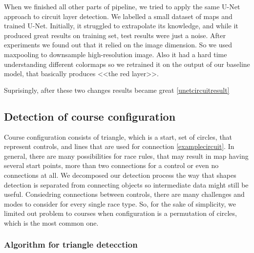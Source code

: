 \documentclass[a4paper,12pt]{extarticle}
\begin{document}
When we finished all other parts of pipeline, we tried to apply the same U-Net approach to circuit layer detection.
We labelled a small dataset of maps and trained U-Net.
Initially, it struggled to extrapolate its knowledge, and while it produced great results on training set, test results were just a noise.
After experiments we found out that it relied on the image dimension. So we used maxpooling to downsample high-resolution image.
Also it had a hard time understanding different colormaps so we retrained it on the output of our baseline model, that basically produces <<the red layer>>. 

Suprisingly, after these two changes results became great \ref{unetcircuitresult}

\subsection{Detection of course configuration}

Course configuration consists of triangle, which is a start, set of circles, that represent controls, and lines that are used for connection \ref{examplecircuit}.
In general, there are many possibilities for race rules, that may result in map having several start points, more than two connections for a control or even no connections at all.
We decomposed our detection process the way that shapes detection is separated from connecting objects so intermediate data might still be useful.
Consiedring connections between controls, there are many challenges and modes to consider for every single race type.
So, for the sake of simplicity, we limited out problem to courses when  configuration is a permutation of circles, which is the most common one.

\subsubsection{Algorithm for triangle detecction}
\end{document}
